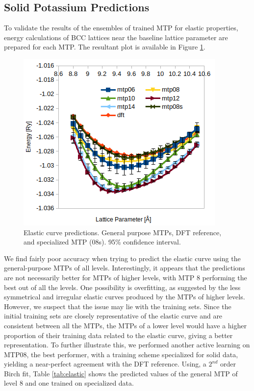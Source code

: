 \documentclass[9pt,twocolumn,twoside]{opticajnl}
\begin{document}
\subsection{Solid Potassium Predictions}
To validate the results of the ensembles of trained MTP for elastic properties, energy calculations of BCC lattices near the baseline lattice parameter are prepared for each MTP. The resultant plot is available in Figure \ref{fig:elastic}.

\begin{figure}[ht]
  \centering
  \includegraphics[width=\linewidth]{assets/curve.png}
  \caption{Elastic curve predictions. General purpose MTPs, DFT reference, and specialized MTP (08s). 95\% confidence interval.}
  \label{fig:elastic}
\end{figure}

We find fairly poor accuracy when trying to predict the elastic curve using the general-purpose MTPs of all levels. Interestingly, it appears that the predictions are not necessarily better for MTPs of higher levels, with MTP 8 performing the best out of all the levels. One possibility is overfitting, as suggested by the less symmetrical and irregular elastic curves produced by the MTPs of higher levels. However, we suspect that the issue may lie with the training sets. Since the initial training sets are closely representative of the elastic curve and are consistent between all the MTPs, the MTPs of a lower level would have a higher proportion of their training data related to the elastic curve, giving a better representation.  To further illustrate this, we performed another active learning on MTP08, the best performer, with a training scheme specialized for solid data, yielding a near-perfect agreement with the DFT reference. Using, a $2^{nd}$ order Birch fit, Table \ref{tab:elastic} shows the predicted values of the general MTP of level 8 and one trained on specialized data. 
\end{document}
